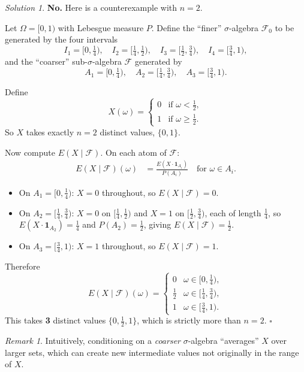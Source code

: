 \documentclass[12pt]{article}
\theoremstyle{remark}
\newtheorem*{solution}{Solution}
\newtheorem*{remark}{Remark}
\begin{document}
\begin{solution}
\textbf{No.}  Here is a counterexample with $n = 2$.

Let $\Omega = [0,1)$ with Lebesgue measure $P$.  Define the ``finer''
$\sigma$-algebra $\mathcal{F}_0$ to be generated by the four intervals
\[
  I_1 = [0,\tfrac{1}{4}),\quad I_2 = [\tfrac{1}{4},\tfrac{1}{2}),\quad
  I_3 = [\tfrac{1}{2},\tfrac{3}{4}),\quad I_4 = [\tfrac{3}{4},1),
\]
and the ``coarser'' sub-$\sigma$-algebra $\mathcal{F}$ generated by
\[
  A_1 = [0,\tfrac{1}{4}),\quad A_2 = [\tfrac{1}{4},\tfrac{3}{4}),\quad A_3 = [\tfrac{3}{4},1).
\]

Define
\[
  X(\omega) = \begin{cases} 0 & \text{if } \omega < \tfrac{1}{2}, \\ 1 & \text{if } \omega \ge \tfrac{1}{2}. \end{cases}
\]
So $X$ takes exactly $n = 2$ distinct values, $\{0, 1\}$.

Now compute $E(X \mid \mathcal{F})$.  On each atom of $\mathcal{F}$:
\begin{align*}
  E(X \mid \mathcal{F})(\omega) &= \frac{E(X \cdot \mathbf{1}_{A_i})}{P(A_i)} \quad \text{for } \omega \in A_i.
\end{align*}
\begin{itemize}
  \item On $A_1 = [0,\tfrac{1}{4})$: $X = 0$ throughout, so $E(X \mid \mathcal{F}) = 0$.
  \item On $A_2 = [\tfrac{1}{4},\tfrac{3}{4})$: $X = 0$ on $[\tfrac{1}{4},\tfrac{1}{2})$ and $X = 1$ on $[\tfrac{1}{2},\tfrac{3}{4})$, each of length $\tfrac{1}{4}$, so
        $E(X \cdot \mathbf{1}_{A_2}) = \tfrac{1}{4}$ and $P(A_2) = \tfrac{1}{2}$, giving $E(X \mid \mathcal{F}) = \tfrac{1}{2}$.
  \item On $A_3 = [\tfrac{3}{4},1)$: $X = 1$ throughout, so $E(X \mid \mathcal{F}) = 1$.
\end{itemize}

Therefore
\[
  E(X \mid \mathcal{F})(\omega) = \begin{cases}
    0 & \omega \in [0,\tfrac{1}{4}), \\
    \tfrac{1}{2} & \omega \in [\tfrac{1}{4},\tfrac{3}{4}), \\
    1 & \omega \in [\tfrac{3}{4},1).
  \end{cases}
\]
This takes \textbf{3} distinct values $\{0, \tfrac{1}{2}, 1\}$, which is strictly more
than $n = 2$. \hfill$\square$

\begin{remark}
Intuitively, conditioning on a \emph{coarser} $\sigma$-algebra ``averages'' $X$ over
larger sets, which can create new intermediate values not originally in the range of $X$.
\end{remark}
\end{solution}
\end{document}
